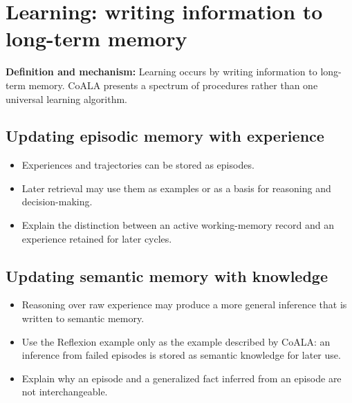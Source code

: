 \section{Learning: writing information to long-term memory}
\textbf{Definition and mechanism:} Learning occurs by writing information to long-term memory. CoALA presents a spectrum of procedures rather than one universal learning algorithm.

\subsection*{Updating episodic memory with experience}
\begin{itemize}
  \item Experiences and trajectories can be stored as episodes.
  \item Later retrieval may use them as examples or as a basis for reasoning and decision-making.
  \item Explain the distinction between an active working-memory record and an experience retained for later cycles.
\end{itemize}

\subsection*{Updating semantic memory with knowledge}
\begin{itemize}
  \item Reasoning over raw experience may produce a more general inference that is written to semantic memory.
  \item Use the Reflexion example only as the example described by CoALA: an inference from failed episodes is stored as semantic knowledge for later use.
  \item Explain why an episode and a generalized fact inferred from an episode are not interchangeable.
\end{itemize}

